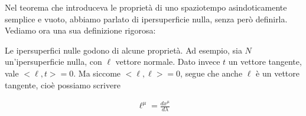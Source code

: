 \documentclass{report}
\begin{document}
Nel teorema che introduceva le proprietà di uno spaziotempo asindoticamente semplice e vuoto, abbiamo parlato di ipersuperficie nulla, senza però definirla. Vediamo ora una sua definizione rigorosa: 


Le ipersuperfici nulle godono di alcune proprietà. Ad esempio, sia \(N\) un'ipersuperficie nulla, con \(\ell\) vettore normale. Dato invece \(t\) un vettore tangente, vale \(<\ell, t> =0\). Ma siccome \(<\ell, \ell> =0\), segue che anche \(\ell\) è un vettore tangente, cioè possiamo scrivere 

\begin{align}
    \ell^\mu = \frac{dx^\mu}{d\lambda}
\end{align}

\end{document}
